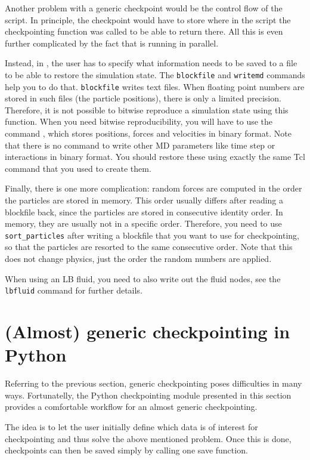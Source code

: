 Another problem with a generic checkpoint would be the control flow of
the script. In principle, the checkpoint would have to store where in
the script the checkpointing function was called to be able to return
there.  All this is even further complicated by the fact that \es is
running in parallel.

Instead, in \es, the user has to specify what information needs to be
saved to a file to be able to restore the simulation state.  The
\texttt{blockfile} and \texttt{writemd} commands help you to do that.
\texttt{blockfile} writes text files.  When floating point numbers are
stored in such files (\eg the particle positions), there is only a
limited precision.  Therefore, it is not possible to bitwise reproduce
a simulation state using this function. When you need bitwise
reproducibility, you will have to use the command , which
stores positions, forces and velocities in binary format.  Note that
there is no command to write other MD parameters like time step or
interactions in binary format. You should restore these using exactly
the same Tcl command that you used to create them.

Finally, there is one more complication: random forces are computed
in the order the particles are stored in memory. This order usually
differs after reading a blockfile back, since the particles are
stored in consecutive identity order. In memory, they are usually
not in a specific order. Therefore, you need to use \texttt{sort_particles}
after writing a blockfile that you want to use for checkpointing, so
that the particles are resorted to the same consecutive order. Note
that this does not change physics, just the order the random numbers
are applied.

When using an LB fluid, you need to also write out the fluid nodes,
see the \texttt{lbfluid} command for further details.


\section{(Almost) generic checkpointing in Python}
Referring to the previous section, generic checkpointing poses difficulties 
in many ways. Fortunatelly, the Python checkpointing module presented in 
this section provides a comfortable workflow for an almost generic 
checkpointing.

The idea is to let the user initially define which data is 
of interest for checkpointing and thus solve the above mentioned problem. 
Once this is done, checkpoints can then be saved simply by calling one
save function.

